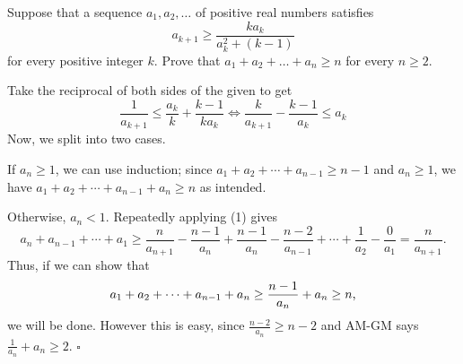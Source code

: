 
\begin{problem}[ISL 2015 A1]
    Suppose that a sequence $a_1,a_2,\ldots$ of positive real numbers satisfies \[a_{k+1}\geq\frac{ka_k}{a_k^2+(k-1)}\] for every positive integer $k$. Prove that $a_1+a_2+\ldots+a_n\geq n$ for every $n\geq2$.
\end{problem}

\begin{solution}[Ritwin]
    Take the reciprocal of both sides of the given to get
    \[\frac{1}{a_{k+1}} \leq \frac{a_k}{k} + \frac{k-1}{ka_k} \Longleftrightarrow \frac{k}{a_{k+1}} - \frac{k-1}{a_k} \leq a_k \tag{1}\]
    Now, we split into two cases.
    
    If $a_n \geq 1$, we can use induction; since $a_1 + a_2 + \cdots + a_{n-1} \geq n-1$
    and $a_n \geq 1$, we have $a_1 + a_2 + \cdots + a_{n-1} + a_n \geq n$ as intended.
    
    Otherwise, $a_n < 1$. Repeatedly applying (1) gives
    \[a_n + a_{n-1} + \cdots + a_1 \geq \frac{n}{a_{n+1}} - \frac{n-1}{a_n} + \frac{n-1}{a_n} - \frac{n-2}{a_{n-1}} + \cdots + \frac{1}{a_2} - \frac{0}{a_1} = \frac{n}{a_{n+1}}.\]
    Thus, if we can show that
    \[a_1 + a_2 + \cdots + a_{n-1} + a_n \geq \frac{n-1}{a_n} + a_n \geq n\text,\]
    we will be done. However this is easy, since $\frac{n-2}{a_n} \geq n-2$ and
    AM-GM says $\frac{1}{a_n} + a_n \geq 2$. $\square$
\end{solution}

